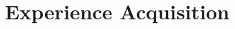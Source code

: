 \documentclass[sn-basic, Numbered]{sn-jnl}%
\theoremstyle{thmstyleone}%
\theoremstyle{thmstyletwo}%
\theoremstyle{thmstylethree}%
\begin{document}

    




% 
\section{Experience Acquisition}
\label{sec:gaining experience}
\end{document}
